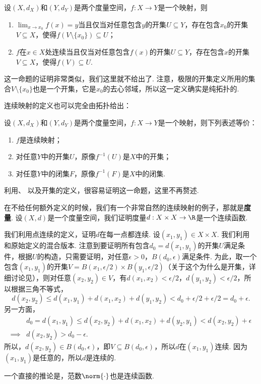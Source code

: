 \begin{theorem}\label{thm:continuous-open}
    设$(X,d_X)$和$(Y,d_Y)$是两个度量空间，$f:X\to Y$是一个映射，则
\begin{enumerate}
    \item $\lim_{x\to x_0} f(x)=y$当且仅当对任意包含$y$的开集$U\subseteq Y$，存在包含$x_0$的开集$V\subseteq X$，使得$f(V\setminus\{x_0\})\subseteq U$；
    \item  $f$在$x\in X$处连续当且仅当对任意包含$f(x)$的开集$U\subseteq Y$，存在包含$x$的开集$V\subseteq X$，使得$f(V)\subseteq U$.
\end{enumerate}
\end{theorem}

这一命题的证明非常类似，我们这里就不给出了. 注意，极限的开集定义所用的集合$V\setminus\{x_0\}$也是一个开集，它是$x_0$的去心邻域，所以这一定义确实是纯拓扑的. 

连续映射的定义也可以完全由拓扑给出：

\begin{theorem}\label{thm:continuous-topology}
    设$(X,d_X)$和$(Y,d_Y)$是两个度量空间，$f:X\to Y$是一个映射，则下列表述等价：
    \begin{enumerate}
        \item $f$是连续映射；
        \item 对任意$Y$中的开集$U$，原像$f^{-1}(U)$是$X$中的开集；
        \item 对任意$Y$中的闭集$F$，原像$f^{-1}(F)$是$X$中的闭集. 
    \end{enumerate}
\end{theorem}

利用、 以及开集的定义，很容易证明这一命题，这里不再赘述. 

\begin{example}\label{ex:metric-norm-continuous}
在不给任何额外定义的时候，我们有一个非常自然的连续映射的例子，那就是\textbf{度量}. 设$(X,d)$是一个度量空间，我们证明度量$d:X\times X\to\R$是一个连续函数. 

我们利用点连续的定义，证明$d$在每一点都连续. 设$(x_1,y_1)\in X\times X$. 我们利用 和原始定义的混合版本. 注意到要证明所有包含$d_0=d(x_1,y_1)$的开集$U$满足条件，根据$U$的构造，只需要证明，对任意$\epsilon>0$，$B(d_0,\epsilon)$满足条件. 为此，取一个包含$(x_1,y_1)$的开集$V=B(x_1,\epsilon/2)\times B(y_1,\epsilon/2)$（关于这个为什么是开集，详细讨论见），则对任意$(x_2,y_2)\in V$，有$d(x_1,x_2)<\epsilon/2$，$d(y_1,y_2)<\epsilon/2$，所以根据三角不等式，
\[d(x_2,y_2)\leq d(x_1,y_1)+d(x_1,x_2)+d(y_1,y_2)<d_0+\epsilon/2+\epsilon/2=d_0+\epsilon.\]
另一方面，
\begin{align*}
    &d_0=d(x_1,y_1)\leq d(x_2,y_2)+d(x_1,x_2)+d(y_2,y_1)<d(x_2,y_2)+\epsilon\\
\implies& d(x_2,y_2)>d_0-\epsilon.
\end{align*}
所以，$d(x_2,y_2)\in B(d_0,\epsilon)$，即$V\subseteq B(d_0,\epsilon)$，所以$d$在$(x_1,y_1)$连续. 因为$(x_1,y_1)$是任意的，所以$d$是连续的.

一个直接的推论是，范数$\norm{\cdot}$也是连续函数. 
\end{example}

